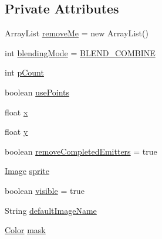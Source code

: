 \subsection*{Private Attributes}
\begin{DoxyCompactItemize}
\item 
Array\+List \mbox{\hyperlink{classorg_1_1newdawn_1_1slick_1_1particles_1_1_particle_system_a1c1a1570c8ea86baf6963cb238f82480}{remove\+Me}} = new Array\+List()
\item 
int \mbox{\hyperlink{classorg_1_1newdawn_1_1slick_1_1particles_1_1_particle_system_af4dc719d60d72b365f59850a2cfdf7a6}{blending\+Mode}} = \mbox{\hyperlink{classorg_1_1newdawn_1_1slick_1_1particles_1_1_particle_system_a6e5a43dd58a794750f52fa0df8282e75}{B\+L\+E\+N\+D\+\_\+\+C\+O\+M\+B\+I\+NE}}
\item 
int \mbox{\hyperlink{classorg_1_1newdawn_1_1slick_1_1particles_1_1_particle_system_ad811064cd2cca4105b49ad71a47a72aa}{p\+Count}}
\item 
boolean \mbox{\hyperlink{classorg_1_1newdawn_1_1slick_1_1particles_1_1_particle_system_ac3757b740ac52bac42a01c4f6944c660}{use\+Points}}
\item 
float \mbox{\hyperlink{classorg_1_1newdawn_1_1slick_1_1particles_1_1_particle_system_a3a332738b4f587da66ea20842e5745cc}{x}}
\item 
float \mbox{\hyperlink{classorg_1_1newdawn_1_1slick_1_1particles_1_1_particle_system_a507fdd9d8d8f431e3d70ec770e6f9bb7}{y}}
\item 
boolean \mbox{\hyperlink{classorg_1_1newdawn_1_1slick_1_1particles_1_1_particle_system_aef5bd9da423c6e554d0ea54d1df329c9}{remove\+Completed\+Emitters}} = true
\item 
\mbox{\hyperlink{classorg_1_1newdawn_1_1slick_1_1_image}{Image}} \mbox{\hyperlink{classorg_1_1newdawn_1_1slick_1_1particles_1_1_particle_system_a42359ac9175deb095eaa520263e352da}{sprite}}
\item 
boolean \mbox{\hyperlink{classorg_1_1newdawn_1_1slick_1_1particles_1_1_particle_system_ad2769d90adecc35330066468f02ac881}{visible}} = true
\item 
String \mbox{\hyperlink{classorg_1_1newdawn_1_1slick_1_1particles_1_1_particle_system_abfa2b543e5b6bca876a15493efb25688}{default\+Image\+Name}}
\item 
\mbox{\hyperlink{classorg_1_1newdawn_1_1slick_1_1_color}{Color}} \mbox{\hyperlink{classorg_1_1newdawn_1_1slick_1_1particles_1_1_particle_system_a75111c35416632fb81c11c808d0158d0}{mask}}
\end{DoxyCompactItemize}
